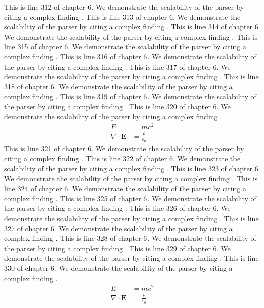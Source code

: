 This is line 312 of chapter 6. We demonstrate the scalability of the parser by citing a complex finding \cite{ref6_312}.
This is line 313 of chapter 6. We demonstrate the scalability of the parser by citing a complex finding \cite{ref6_313}.
This is line 314 of chapter 6. We demonstrate the scalability of the parser by citing a complex finding \cite{ref6_314}.
This is line 315 of chapter 6. We demonstrate the scalability of the parser by citing a complex finding \cite{ref6_315}.
This is line 316 of chapter 6. We demonstrate the scalability of the parser by citing a complex finding \cite{ref6_316}.
This is line 317 of chapter 6. We demonstrate the scalability of the parser by citing a complex finding \cite{ref6_317}.
This is line 318 of chapter 6. We demonstrate the scalability of the parser by citing a complex finding \cite{ref6_318}.
This is line 319 of chapter 6. We demonstrate the scalability of the parser by citing a complex finding \cite{ref6_319}.
This is line 320 of chapter 6. We demonstrate the scalability of the parser by citing a complex finding \cite{ref6_320}.
\begin{align*}
  E &= mc^2 \\
  \nabla \cdot \mathbf{E} &= \frac{\rho}{\varepsilon_0}
\end{align*}
This is line 321 of chapter 6. We demonstrate the scalability of the parser by citing a complex finding \cite{ref6_321}.
This is line 322 of chapter 6. We demonstrate the scalability of the parser by citing a complex finding \cite{ref6_322}.
This is line 323 of chapter 6. We demonstrate the scalability of the parser by citing a complex finding \cite{ref6_323}.
This is line 324 of chapter 6. We demonstrate the scalability of the parser by citing a complex finding \cite{ref6_324}.
This is line 325 of chapter 6. We demonstrate the scalability of the parser by citing a complex finding \cite{ref6_325}.
This is line 326 of chapter 6. We demonstrate the scalability of the parser by citing a complex finding \cite{ref6_326}.
This is line 327 of chapter 6. We demonstrate the scalability of the parser by citing a complex finding \cite{ref6_327}.
This is line 328 of chapter 6. We demonstrate the scalability of the parser by citing a complex finding \cite{ref6_328}.
This is line 329 of chapter 6. We demonstrate the scalability of the parser by citing a complex finding \cite{ref6_329}.
This is line 330 of chapter 6. We demonstrate the scalability of the parser by citing a complex finding \cite{ref6_330}.
\begin{align*}
  E &= mc^2 \\
  \nabla \cdot \mathbf{E} &= \frac{\rho}{\varepsilon_0}
\end{align*}
